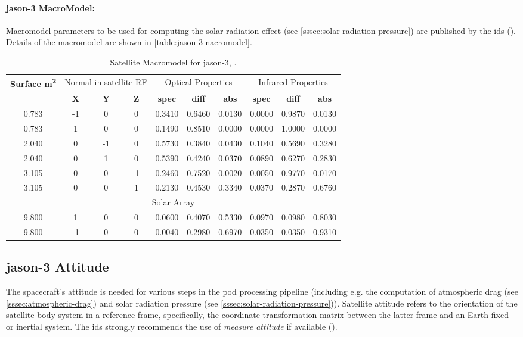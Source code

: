 \paragraph{\gls{jason}-3 MacroModel:}
Macromodel parameters to be used for computing 
the solar radiation effect (see \autoref{sssec:solar-radiation-pressure}) are 
published by the \gls{ids} (\cite{Cerri2022}). Details of the macromodel are 
shown in \autoref{table:jason-3-nacromodel}.
\begin{table}[h!]
    \centering
    \begin{tabular}{cccccccccc}
        \toprule
        \textbf{Surface \si{\meter\tothe{2}}} & 
            \multicolumn{3}{c}{Normal in satellite RF} &
            \multicolumn{3}{c}{Optical Properties} &
            \multicolumn{3}{c}{Infrared Properties} \\
         & 
         \textbf{X} & \textbf{Y} & \textbf{Z} &
         \textbf{spec} & \textbf{diff} & \textbf{abs} &
         \textbf{spec} & \textbf{diff} & \textbf{abs} \\
        \hline
        0.783& -1&   0&  0& 0.3410& 0.6460& 0.0130& 0.0000& 0.9870& 0.0130 \\
        0.783&  1 &  0&  0& 0.1490& 0.8510& 0.0000& 0.0000& 1.0000& 0.0000 \\
        2.040&  0 & -1&  0& 0.5730& 0.3840& 0.0430& 0.1040& 0.5690& 0.3280 \\
        2.040&  0 &  1&  0& 0.5390& 0.4240& 0.0370& 0.0890& 0.6270& 0.2830 \\
        3.105&  0 &  0& -1& 0.2460& 0.7520& 0.0020& 0.0050& 0.9770& 0.0170 \\
        3.105&  0 &  0&  1& 0.2130& 0.4530& 0.3340& 0.0370& 0.2870& 0.6760 \\
        \multicolumn{10}{c}{Solar Array} \\
        9.800&  1& 0& 0& 0.0600& 0.4070& 0.5330& 0.0970& 0.0980& 0.8030 \\
        9.800& -1& 0& 0& 0.0040& 0.2980& 0.6970& 0.0350& 0.0350& 0.9310 \\
       \bottomrule
    \end{tabular}
    \caption{Satellite Macromodel for \gls{jason}-3, \cite{Cerri2022}.}
    \label{table:jason-3-nacromodel}
\end{table}

\subsection{\gls{jason}-3 Attitude}\label{ssec:jason3-attitude}
The spacecraft's attitude is needed for various steps in the \gls{pod} processing 
pipeline (including e.g. the computation of atmospheric drag (see 
\autoref{sssec:atmospheric-drag}) and solar radiation pressure (see 
\autoref{sssec:solar-radiation-pressure})). Satellite attitude refers to the 
orientation of the satellite body system in a reference frame, specifically, the 
coordinate transformation matrix between the latter frame and an Earth-fixed 
or inertial system. The \gls{ids} strongly recommends the use of \emph{measure attitude} 
if available (\cite{IdsRecommendationItrf2020}). 

